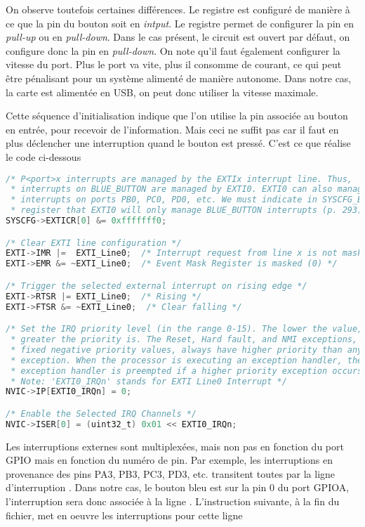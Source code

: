 \documentclass{FicheLecture}
\begin{document}
On observe toutefois certaines différences. Le registre  est configuré de manière à ce que la pin du bouton soit en \emph{intput}. Le registre  permet de configurer la pin en \emph{pull-up} ou en \emph{pull-down}. Dans le cas présent, le circuit est ouvert par défaut, on configure donc la pin en \emph{pull-down}. On note qu'il faut également configurer la vitesse du port. Plus le port va vite, plus il consomme de courant, ce qui peut être pénalisant pour un système alimenté de manière autonome. Dans notre cas, la carte est alimentée en USB, on peut donc utiliser la vitesse maximale.

Cette séquence d'initialisation indique que l'on utilise la pin associée au bouton en entrée, pour recevoir de l'information. Mais ceci ne suffit pas car il faut en plus déclencher une interruption quand le bouton est pressé. C'est ce que réalise le code ci-dessous

\begin{lstlisting}[language=C]
/* P<port>x interrupts are managed by the EXTIx interrupt line. Thus,
 * interrupts on BLUE_BUTTON are managed by EXTI0. EXTI0 can also manage
 * interrupts on ports PB0, PC0, PD0, etc. We must indicate in SYSCFG_EXTICR1
 * register that EXTI0 will only manage BLUE_BUTTON interrupts (p. 293) */
SYSCFG->EXTICR[0] &= 0xfffffff0;

/* Clear EXTI line configuration */
EXTI->IMR |=  EXTI_Line0;  /* Interrupt request from line x is not masked (1) */
EXTI->EMR &= ~EXTI_Line0;  /* Event Mask Register is masked (0) */

/* Trigger the selected external interrupt on rising edge */
EXTI->RTSR |= EXTI_Line0;  /* Rising */
EXTI->FTSR &= ~EXTI_Line0;  /* Clear falling */

/* Set the IRQ priority level (in the range 0-15). The lower the value, the
 * greater the priority is. The Reset, Hard fault, and NMI exceptions, with
 * fixed negative priority values, always have higher priority than any other
 * exception. When the processor is executing an exception handler, the
 * exception handler is preempted if a higher priority exception occurs. 
 * Note: 'EXTI0_IRQn' stands for EXTI Line0 Interrupt */
NVIC->IP[EXTI0_IRQn] = 0;

/* Enable the Selected IRQ Channels */
NVIC->ISER[0] = (uint32_t) 0x01 << EXTI0_IRQn;
\end{lstlisting}

Les interruptions externes sont multiplexées, mais non pas en fonction du port GPIO mais en fonction du numéro de pin. Par exemple, les interruptions en provenance des pins PA3, PB3, PC3, PD3, etc. transitent toutes par la ligne d'interruption . Dans notre cas, le bouton bleu est sur la pin 0 du port GPIOA, l'interruption sera donc associée à la ligne . L'instruction suivante, à la fin du fichier, met en oeuvre les interruptions pour cette ligne
\end{document}
